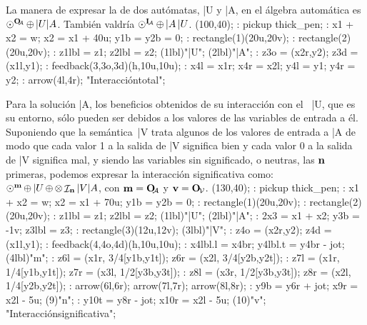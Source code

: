 La manera de expresar la  de dos
autómatas, |U y |A, en el álgebra automática es
 $\fdb^{\outA} \srl |U |A$. También valdría
 $\fdb^{\inpA} \srl |A \, |U$.
\MTbeginfigure(100,40);
 \MT: pickup thick_pen;
 \MT: x1 + x2 = w; x2 = x1 + 40u; y1b = y2b = 0;
 \MT: rectangle(1)(20u,20v); %
 \MT: rectangle(2)(20u,20v); %
 \MT: z1lbl = z1; z2lbl = z2;
 \MTlabel(1lbl)"|U";
 \MTlabel(2lbl)"|A";
 \MT: z3o = (x2r,y2); z3d = (x1l,y1);
 \MT: feedback(3,3o,3d)(h,10u,10u);
 \MT: x4l = x1r; x4r = x2l; y4l = y1; y4r = y2;
 \MT: arrow(4l,4r); %
\MTendfigure"Interacción\cr total";

Para la solución |A, los beneficios obtenidos de su interacción con el
~|U, que es su entorno, sólo pueden ser debidos a los
valores de las variables de entrada a él.  Suponiendo que la
semántica~|V trata algunos de los valores de entrada a |A de modo que cada
valor 1 a la salida de |V significa bien y cada valor 0 a la salida de |V
significa mal, y siendo las variables sin significado, o neutras, las ${\bf n}$ primeras, podemos expresar la interacción significativa como:
 $\fdb^{\no m} \srl |U \srl \prl \ID_{\no n} |V |A$,
con $\no m = \outA$ y $\no v = \out V$.
\MTbeginfigure(130,40);
 \MT: pickup thick_pen;
 \MT: x1 + x2 = w; x2 = x1 + 70u; y1b = y2b = 0;
 \MT: rectangle(1)(20u,20v); %
 \MT: rectangle(2)(20u,20v); %
 \MT: z1lbl = z1; z2lbl = z2;
 \MTlabel(1lbl)"|U";
 \MTlabel(2lbl)"|A";
 \MT: 2x3 = x1 + x2; y3b = -1v; z3lbl = z3;
 \MT: rectangle(3)(12u,12v); %
 \MTlabel(3lbl)"|V";
 \MT: z4o = (x2r,y2); z4d = (x1l,y1);
 \MT: feedback(4,4o,4d)(h,10u,10u);
 \MT: x4lbl.l = x4br; y4lbl.t = y4br - jot;
 \MTlabel(4lbl)"\no m";
 \MT: z6l = (x1r, 3/4[y1b,y1t]); z6r = (x2l, 3/4[y2b,y2t]);
 \MT: z7l = (x1r, 1/4[y1b,y1t]); z7r = (x3l, 1/2[y3b,y3t]);
 \MT: z8l = (x3r, 1/2[y3b,y3t]); z8r = (x2l, 1/4[y2b,y2t]);
 \MT: arrow(6l,6r); arrow(7l,7r); arrow(8l,8r); %
 \MT: y9b = y6r + jot; x9r = x2l - 5u;
 \MTlabel(9)"\no n";
 \MT: y10t = y8r - jot; x10r = x2l - 5u;
 \MTlabel(10)"\no v";
\MTendfigure"Interacción\cr significativa";

